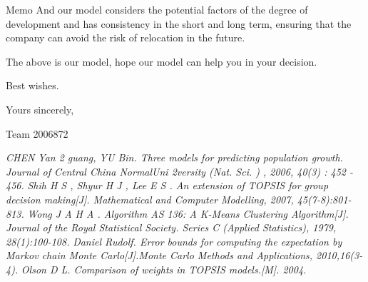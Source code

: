 \documentclass[12pt]{article}  %
\begin{document}
\begin{letter}{Memo}
	And our model considers the potential factors of the degree of development and has consistency in the short and long term, ensuring that the company can avoid the risk of relocation in the future.
	
	The above is our model, hope our model can help you in your decision.
	
	Best wishes.
	\begin{flushright}
		Yours sincerely,
		
		Team 2006872
	\end{flushright}

\end{letter}
\begin{thebibliography}{99}
 \emph{CHEN Yan 2 guang, YU Bin. Three models for predicting population growth. Journal of Central China NormalUni 2versity (Nat. Sci. ) , 2006, 40(3) : 452 - 456.}
 \emph{Shih H S , Shyur H J , Lee E S . An extension of TOPSIS for group decision making[J]. Mathematical and Computer Modelling, 2007, 45(7-8):801-813.
}
\emph{Wong J A H A . Algorithm AS 136: A K-Means Clustering Algorithm[J]. Journal of the Royal Statistical Society. Series C (Applied Statistics), 1979, 28(1):100-108.
}
\emph{Daniel Rudolf. Error bounds for computing the expectation by Markov chain Monte Carlo[J].Monte Carlo Methods and Applications, 2010,16(3-4).}
\emph{Olson D L. Comparison of weights in TOPSIS models.[M]. 2004.
}
\end{thebibliography}
\end{document}

